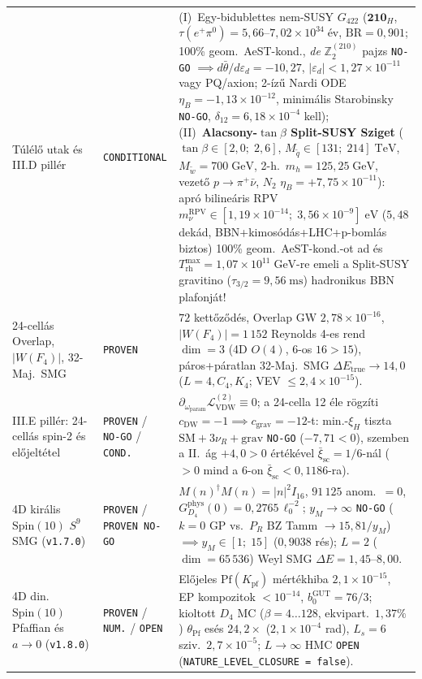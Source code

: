 \documentclass[11pt,a4paper]{article}
\begin{document}
\begin{table}[t!]
\begin{tabular}{p{3.9cm}p{2.0cm}p{9.2cm}}
Túlélő utak és III.D pillér & \texttt{CONDITIONAL} & (I)~Egy-bidublettes nem-SUSY $G_{422}$ ($\mathbf{210}_H$, $\tau(e^+\pi^0)=5{,}66\text{--}7{,}02\times 10^{34}\;\text{év}$, $\mathrm{BR}=0{,}901$; 100\% geom.\ AeST-kond., \emph{de} $\mathbb{Z}_2^{(210)}$ pajzs \texttt{NO-GO} $\implies d\bar\theta/d\varepsilon_d=-10{,}27$, $|\varepsilon_d|<1{,}27\times 10^{-11}$ vagy PQ/axion; 2-ízű Nardi ODE $\eta_B=-1{,}13\times 10^{-12}$, minimális Starobinsky \texttt{NO-GO}, $\delta_{12}=6{,}18\times 10^{-4}$ kell); (II)~\textbf{Alacsony-$\tan\beta$ Split-SUSY Sziget} ($\tan\beta\in[2{,}0;\; 2{,}6]$, $M_{\tilde q}\in[131;\; 214]\;\mathrm{TeV}$, $M_{\tilde w}=700\;\mathrm{GeV}$, 2-h.\ $m_h=125{,}25\;\mathrm{GeV}$, vezető $p\to\pi^+\bar\nu$, $N_2$ $\eta_B=+7{,}75\times 10^{-11}$): apró bilineáris RPV $m_\nu^{\mathrm{RPV}}\in[1{,}19\times 10^{-14};\; 3{,}56\times 10^{-9}]\;\mathrm{eV}$ ($5{,}48$ dekád, BBN+kimosódás+LHC+p-bomlás biztos) 100\% geom.\ AeST-kond.-ot ad és $T_{\mathrm{rh}}^{\max}=1{,}07\times 10^{11}\;\mathrm{GeV}$-re emeli a Split-SUSY gravitino ($\tau_{3/2}=9{,}56\;\mathrm{ms}$) hadronikus BBN plafonját! \\
24-cellás Overlap, $|W(F_4)|$, 32-Maj.\ SMG & \texttt{PROVEN} & $72$ kettőződés, Overlap GW $2{,}78\times 10^{-16}$, $|W(F_4)|=1\,152$ Reynolds 4-es rend $\dim=3$ (4D $O(4)$, 6-os $16>15$), páros+páratlan 32-Maj.\ SMG $\Delta E_{\mathrm{true}}\to 14{,}0$ ($L=4, C_4, K_4$; VEV $\le 2{,}4\times 10^{-15}$). \\
III.E pillér: 24-cellás spin-2 és előjeltétel & \texttt{PROVEN} / \texttt{NO-GO} / \texttt{COND.} & $\partial_{\omega_{\mathrm{param}}}\mathcal{L}_{\mathrm{VDW}}^{(2)}\equiv 0$; a 24-cella 12 éle rögzíti $c_{\mathrm{DW}}=-1\implies c_{\mathrm{grav}}=-12$-t: min.-$\xi_H$ tiszta $\mathrm{SM}+3\nu_R+\text{grav}$ \texttt{NO-GO} ($-7{,}71<0$), szemben a II.~ág $+4{,}0>0$ értékével $\bar\xi_{\mathrm{sc}}=1/6$-nál ($>0$ mind a 6-on $\bar\xi_{\mathrm{sc}}<0{,}1186$-ra). \\
4D királis $\mathrm{Spin}(10)$ $S^9$ SMG (\texttt{v1.7.0}) & \texttt{PROVEN} / \texttt{PROVEN NO-GO} & $M(n)^\dagger M(n)=|n|^2 I_{16}$, $91\,125$ anom.\ $=0$, $G_{D_4}^{\mathrm{phys}}(0)=0{,}2765\,\ell_0^{-2}$; $y_M\to\infty$ \texttt{NO-GO} ($k=0$ GP vs.\ $P_R$ BZ Tamm $\to 15{,}81/y_M$) $\implies y_M\in[1;\; 15]$ ($0{,}9038$ rés); $L=2$ ($\dim=65\,536$) Weyl SMG $\Delta E=1{,}45\text{--}8{,}00$. \\
4D din.\ $\mathrm{Spin}(10)$ Pfaffian és $a\to 0$ (\texttt{v1.8.0}) & \texttt{PROVEN} / \texttt{NUM.} / \texttt{OPEN} & Előjeles $\mathrm{Pf}(K_{\mathrm{pf}})$ mértékhiba $2{,}1\times 10^{-15}$, EP kompozitok $<10^{-14}$, $b_0^{\mathrm{GUT}}=76/3$; kioltott $D_4$ MC ($\beta=4\dots 128$, ekvipart.\ $1{,}37\%$) $\theta_{\mathrm{Pf}}$ esés $24{,}2\times$ ($2{,}1\times 10^{-4}$ rad), $L_s=6$ sziv.\ $2{,}7\times 10^{-5}$; $L\to\infty$ HMC \texttt{OPEN} (\texttt{NATURE\_LEVEL\_CLOSURE = false}). \\
\bottomrule
\end{tabular}
\end{table}
\end{document}
